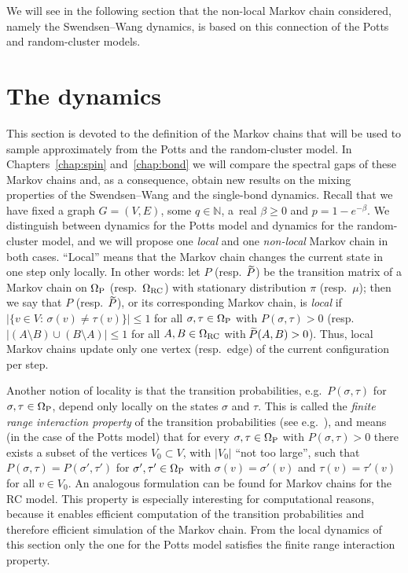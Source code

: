 \documentclass{dis}
\theoremstyle{citing}
\begin{document}
We will see in the following section that the 
non-local Markov chain considered, namely the Swendsen--Wang dynamics, 
is based on this connection of the Potts and random-cluster models. 

\section{The dynamics} \label{sec:2_dynamics}

This section is devoted to the definition of the 
Markov chains that will be used to sample approximately 
from the Potts and the random-cluster model. 
In Chapters~\ref{chap:spin} and~\ref{chap:bond} 
we will compare the spectral gaps of these Markov chains 
and, as a consequence, obtain new results on 
the mixing properties of the Swendsen--Wang and the single-bond 
dynamics. 
Recall that we have fixed a graph $G=(V,E)$, some $q\in{\ensuremath{\mathbb{N}}}$, 
a~real $\beta\ge0$ and $p=1-e^{-\beta}$.
We distinguish between dynamics for the Potts model 
and dynamics for the random-cluster model, 
and we will propose one \emph{local} and one 
\emph{non-local} Markov chain in both cases. 
``Local'' means that the Markov chain changes the current 
state in one step only locally. In other words:  
let $P$ (resp.~${\raisebox{2pt}{ ${\widetilde{{}}}$ }\mkern-14mu P}$) be the 
transition matrix of a Markov chain on ${\Omega}_{\rm P}$ 
(resp.~${\Omega}_{\rm RC}$) with stationary distribution $\pi$ 
(resp.~$\mu$); then we say that $P$ (resp.~${\raisebox{2pt}{ ${\widetilde{{}}}$ }\mkern-14mu P}$), 
or its corresponding Markov chain, is \emph{local} 
if ${\left\vert {\{v\in V:\, \sigma(v)\neq\tau(v)\}} \right\vert}\le1$ for all 
$\sigma,\tau\in{\Omega}_{\rm P}$ with $P(\sigma,\tau)>0$ 
(resp.~${\left\vert {(A\setminus B) \cup (B\setminus A)} \right\vert}\le1$ for all 
$A,B\in{\Omega}_{\rm RC}$ with ${\raisebox{2pt}{ ${\widetilde{{}}}$ }\mkern-14mu P}(A,B)>0$). 
Thus, local Markov chains update only one 
vertex (resp.~edge) of the current configuration per step. 

Another notion of locality is that the transition 
probabilities, e.g.~$P(\sigma,\tau)$ for $\sigma,\tau\in{\Omega}_{\rm P}$, 
depend only locally on the states $\sigma$ and $\tau$. 
This is called the \emph{finite range interaction property} of 
the transition probabilities (see e.g.~\cite{M}), and means 
(in the case of the Potts model) that for every 
$\sigma,\tau\in{\Omega}_{\rm P}$ with $P(\sigma,\tau)>0$ there exists a 
subset of the vertices $V_0\subset V$, 
with ${\left\vert {V_0} \right\vert}$ 
``not too large'', 
such that $P(\sigma,\tau)=P(\sigma',\tau')$ for 
$\sigma',\tau'\in{\Omega}_{\rm P}$ with $\sigma(v)=\sigma'(v)$ and 
$\tau(v)=\tau'(v)$ for all $v\in V_0$. 
An analogous formulation can be found for Markov chains for the 
RC model.
This property is especially interesting for computational reasons, 
because it enables efficient computation of the transition 
probabilities and therefore efficient simulation of the 
Markov chain.
From the local dynamics of this section only the one for the 
Potts model satisfies the finite range interaction property.
\end{document}
